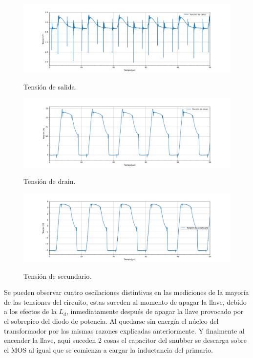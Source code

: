 \begin{figure}[H]
	\centering	\includegraphics[width=0.9\linewidth]{ImagenesParteIV/Vout.png}
	\label{fig:vout_4}
	\caption{Tensión de salida.}
\end{figure}
\begin{figure}[H]
	\centering
	\includegraphics[width=0.9\linewidth]{ImagenesParteIV/Vds.png}
	\label{fig:vds_4}
	\caption{Tensión de drain.}
\end{figure}
\begin{figure}[H]
	\centering
	\includegraphics[width=0.9\linewidth]{ImagenesParteIV/Vsec.png}
	\label{fig:vsec_4}
	\caption{Tensión de secundario.}
\end{figure}
Se pueden observar cuatro oscilaciones distintivas en las mediciones de la mayoría de las tensiones del circuito, estas suceden al momento de apagar la llave, debido a los efectos de la $L_d$, inmediatamente después de apagar la llave provocado por el sobrepico del diodo de potencia. Al quedarse sin energía el núcleo del transformador por las mismas razones explicadas anteriormente. Y finalmente al encender la llave, aqui suceden 2 cosas el capacitor del snubber se descarga sobre el MOS al igual que se comienza a cargar la inductancia del primario.
%